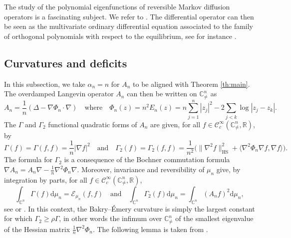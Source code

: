 \documentclass[11pt,reqno]{amsart}
\numberwithin{equation}{section}%
\numberwithin{figure}{section}%
\numberwithin{table}{section}
\theoremstyle{plain}
\theoremstyle{definition}
\begin{document}
The study of the polynomial eigenfunctions of reversible Markov diffusion
operators is a fascinating subject. We refer to
\cite{BakryPolynomialEigenvectors,BakryOrevkovZani}. The differential operator
can then be seen as the multivariate ordinary differential equation associated
to the family of orthogonal polynomials with respect to the equilibrium, see
for instance
\cite{LassalleHermite,LassalleJacobi,LassalleLaguerre,BakerForresterCalogeroSutherland}.

\subsection{Curvatures and deficits}
\label{se:BE}

In this subsection, we take $\alpha_n=n$ for $A_n$ to be aligned with Theorem
\ref{th:main}. The overdamped Langevin operator $A_n$ can then be written on
$\mathbb{C}^n_{\neq}$ as
\begin{equation}\label{eq:generator-alpha-n}
  A_n
  =
  \frac{1}{n}
  \left(
    \Delta-\nabla\Phi_n\cdot\nabla
  \right)
  \quad\text{where}\quad
  \Phi_n(z)
  =n^2E_n(z)
  =n\sum_{j=1}^n|z_j|^2
  -
  2\sum_{j<k}\log|z_j-z_k|.
\end{equation}
The $\Gamma$ and $\Gamma_2$ functional quadratic forms of $A_n$ are given, for all
$f\in\mathcal{C}^\infty_c(\mathbb{C}^n_{\neq},\mathbb{R})$, by
\begin{equation}\label{eq:gamma-two-bochner}
  \Gamma(f)=\Gamma(f,f)=\frac{1}{n}|\nabla f|^2
  \quad\text{and}\quad
  \Gamma_2(f)=\Gamma_2(f,f)
  =\frac{1}{n^2}\bigl(\|\nabla^2f\|_{\mathrm{HS}}^2
  +\langle\nabla^2\Phi_n\nabla f,\nabla f\rangle\bigr).
\end{equation}
The formula for $\Gamma_2$ is a consequence of the Bochner commutation formula
$\nabla A_n=A_n\nabla-\frac{1}{n}\nabla^2\Phi_n\nabla$. Moreover, invariance and
reversibility of $\mu_n$ give, by integration by parts, for all
$f\in\mathcal{C}^\infty_c(\mathbb{C}^n_{\neq},\mathbb{R})$,
\begin{equation}
  \int_{\mathbb{C}^n}\Gamma(f)\mathrm{d}\mu_n =\mathcal{E}_{\mu_n}(f,f)
  \quad\text{and}\quad
  \int_{\mathbb{C}^n}\Gamma_2(f)\mathrm{d}\mu_n =\int_{\mathbb{C}^n}(A_nf)^2\mathrm{d}\mu_n,
\end{equation}
see \cite{BakryPolynomialEigenvectors} or \cite{AneEtAlLSI}. In this context,
the Bakry--Émery curvature is simply the largest constant for which
$\Gamma_2\geq\rho\Gamma$, in other words the infimum over
$\mathbb{C}^n_{\neq}$ of the smallest eigenvalue of the Hessian matrix
$\frac{1}{n}\nabla^2\Phi_n$. The following lemma is taken from
\cite{BolleyChafaiFontbona}.
\end{document}
